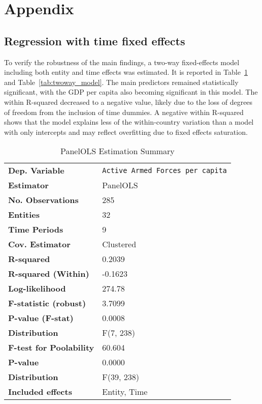 \chapter*{Appendix}

\section*{Regression with time fixed effects}
\label{appendix:twoway}

To verify the robustness of the main findings, a two-way fixed-effects model including 
both entity and time effects was estimated. It is reported in Table~\ref{tab:twoway_summary} and
Table~\ref{tab:twoway_model}.
The main predictors remained statistically 
significant, with the GDP per capita also becoming significant in this model. 
The within R-squared decreased to a negative value, 
likely due to the loss of degrees of freedom from the inclusion of time dummies.
A negative within R-squared shows that the model explains less of the within-country variation 
than a model with only intercepts and may reflect overfitting due to fixed effects saturation. 

\renewcommand{\arraystretch}{1.3}

\begin{table}[htbp]
\caption{PanelOLS Estimation Summary}
\centering
\begin{threeparttable}
\begin{tabularx}{\textwidth}{@{}lX@{}}
\toprule
\textbf{Dep. Variable} & \texttt{Active Armed Forces per capita} \\
\textbf{Estimator} & PanelOLS \\
\textbf{No. Observations} & 285 \\
\textbf{Entities} & 32 \\
\textbf{Time Periods} & 9 \\
\textbf{Cov. Estimator} & Clustered \\
\midrule
\textbf{R-squared} & 0.2039 \\
\textbf{R-squared (Within)} & -0.1623 \\
\textbf{Log-likelihood} & 274.78 \\
\textbf{F-statistic (robust)} & 3.7099 \\
\textbf{P-value (F-stat)} & 0.0008 \\
\textbf{Distribution} & F(7, 238) \\
\midrule
\textbf{F-test for Poolability} & 60.604 \\
\textbf{P-value} & 0.0000 \\
\textbf{Distribution} & F(39, 238) \\
\textbf{Included effects} & Entity, Time \\
\bottomrule
\end{tabularx}
\end{threeparttable}
\label{tab:twoway_summary}
\end{table} 


